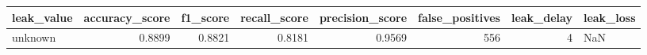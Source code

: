 \begin{tabular}{lrrrrrrl}
\toprule
leak\_value & accuracy\_score & f1\_score & recall\_score & precision\_score & false\_positives & leak\_delay & leak\_loss \\
\midrule
unknown & 0.8899 & 0.8821 & 0.8181 & 0.9569 & 556 & 4 & NaN \\
\bottomrule
\end{tabular}
